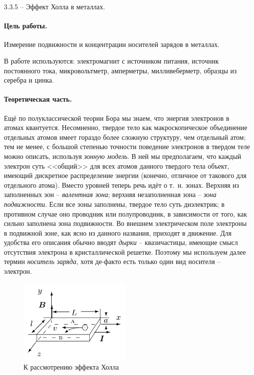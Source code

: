\documentclass{../lab_class}
\begin{document}
{\Large 3.3.5 -- Эффект Холла в металлах.}

\paragraph{Цель работы.}
Измерение подвижности и концентрации носителей зарядов в металлах.

В работе используются: электромагнит с источником питания, источник постоянного тока, микровольтметр, амперметры, милливеберметр, образцы из серебра и цинка.

\paragraph{Теоретическая часть.}
Ещё по полуклассической теории Бора мы знаем, что энергия электронов в атомах квантуется. Несомненно, твердое тело как макроскопическое объединение отдельных атомов имеет гораздо более сложную структуру, чем отдельный атом; тем не менее, с большой степенью точности поведение электронов в твердом теле можно описать, используя \emph{зонную модель}. В ней мы предполагаем, что каждый электрон суть <<общий>> для всех атомов данного твердого тела объект, имеющий дискретное распределение энергии (конечно, отличное от такового для отдельного атома). Вместо уровней теперь речь идёт о т.~н. зонах. Верхняя из заполненных зон -- \emph{валентная зона}; верхняя незаполненная зона -- \emph{зона подвижности}. Если все зоны заполнены, твердое тело суть диэлектрик; в противном случае оно проводник или полупроводник, в зависимости от того, как сильно заполнена зона подвижности. Во внешнем электрическом поле электроны в подвижной зоне, как ясно из данного названия, приходят в движение. Для удобства его описания обычно вводят \emph{дырки} -- квазичастицы, имеющие смысл отсутствия электрона в кристаллической решетке. Поэтому мы используем далее термин \emph{носитель заряда}, хотя де-факто есть только один вид носителя -- электрон.

\begin{figure}
	\centering
	\includegraphics[width=5.5cm]{on_hall.png}
	\caption{К рассмотрению эффекта Холла}
	\label{fig:hall}
\end{figure}
\end{document}
